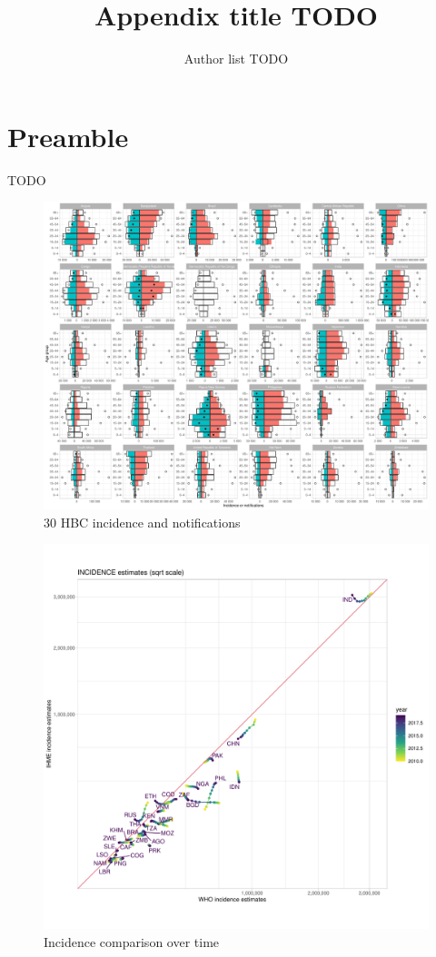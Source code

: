 \documentclass[12pt]{article}
\author{Author list TODO}
\date{}
\title{Appendix title TODO}
\begin{document}
\maketitle
\tableofcontents

\listoffigures


\section{Preamble}
\label{sec:orga0b5156}

TODO

\begin{figure}
\centering
\includegraphics[width=1\textwidth]{../plots/aF1.pdf}
\caption{30 HBC incidence and notifications}
\end{figure}


\FloatBarrier


\begin{figure}
\centering
\includegraphics[width=1\textwidth]{../plots/aF2a.pdf}
\caption{Incidence comparison over time}
\end{figure}
\end{document}
